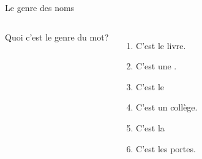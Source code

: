 \begin{frame}{Le genre des noms }
  \begin{columns}
      Quoi c'est le genre du mot? \\
      \begin{enumerate}
        \item {} C'est le livre.
        \item {} C'est une .
        \item {} C'est le
        \item {} C'est un collège.
        \item {} C'est la
        \item {} C'est les portes.
      \end{enumerate}
      
  \end{columns}
\end{frame}